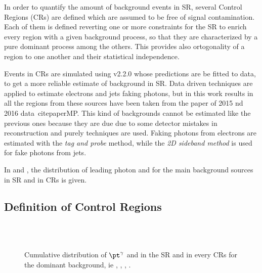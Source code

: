 In order to quantify the amount of background events in SR, several Control Regions (CRs) are defined which are assumed to be free of signal contamination. Each of them is defined reverting one or more constraints for the SR to enrich every region with a given background process, so that they are characterized by a pure dominant process among the others. This provides also ortogonality of a region to one another and their statistical independence.

Events in CRs are simulated using \SHERPA v2.2.0 whose predictions are be fitted to data, to get a more reliable estimate of background in SR. Data driven techniques are applied to estimate electrons and jets faking photons, but in this work results in all the regions from these sources have been taken from the \mph paper of 2015 nd 2016 data~cite{paperMP}. This kind of backgrounds cannot be estimated like the previous ones because they are due due to some detector mistakes in reconstruction and purely \insitu techniques are used. Faking photons from electrons are estimated with the \emph{tag and probe} method, while the \emph{2D sideband method} is used for fake photons from jets.

In \Fig{\ref{fig:prefit}} and \Fig{\ref{fig:prefitcont}}, the distribution of leading photon \pt and \met for the main background sources in SR and in CRs is given.



\subsection{Definition of Control Regions}
\begin{figure}[p]
\centering
{} \quad
{} \\

 \quad
{} \\

\caption{Cumulative distribution of $\pt^{\gamma}$ and \met in the SR and in every CRs for the dominant background, ie \znng, \zg, \wg, \gj.}
\label{fig:prefit}
\end{figure}

